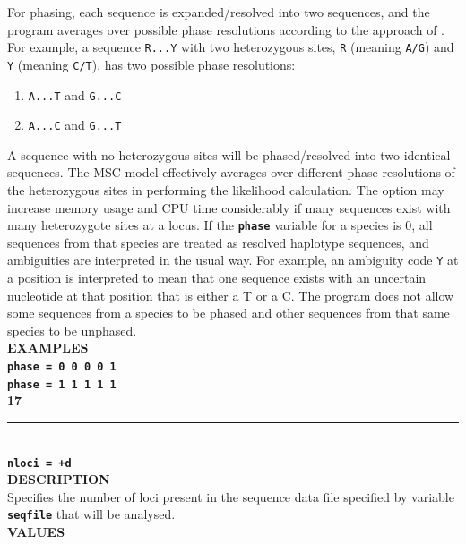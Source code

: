 \documentclass[a4paper]{book}
\numberwithin{equation}{section} \renewcommand{\baselinestretch}{0.55}
\begin{document}
For phasing, each sequence is expanded/resolved into two sequences,
and the program averages over possible phase resolutions according to
the approach of \citet{Gronau2011}.  For example, a sequence
\texttt{R...Y} with two heterozygous sites, \texttt{R} (meaning
\texttt{A/G}) and \texttt{Y} (meaning \texttt{C/T}), has two possible
phase resolutions:
\begin{enumerate}
\item \texttt{A...T} and \texttt{G...C}
\item \texttt{A...C} and \texttt{G...T}
\end{enumerate}
A sequence with no heterozygous sites will be phased/resolved into two
identical sequences.  The MSC model effectively averages over
different phase resolutions of the heterozygous sites in performing
the likelihood calculation.  The option may increase memory usage and
CPU time considerably if many sequences exist with many heterozygote
sites at a locus.  If the \textbf{\texttt{phase}} variable for a
species is 0, all sequences from that species are treated as resolved
haplotype sequences, and ambiguities are interpreted in the usual
way. For example, an ambiguity code \texttt{Y} at a position is
interpreted to mean that one sequence exists with an uncertain
nucleotide at that position that is either a T or a C.  The program
does not allow some sequences from a species to be phased and other
sequences from that same species to be unphased.  \vspace{5pt}\\
\textbf{EXAMPLES} \vspace{5pt}\\
\textbf{\texttt{phase = 0 0 0 0 1}} \vspace{5pt}\\
\textbf{\texttt{phase = 1 1 1 1 1}}\vspace{10pt}\\
\textbf{{\large 17}} \\
\noindent\rule{\textwidth}{0.8pt} \\
\textbf{{\Large \texttt{nloci = +d}}} \vspace{5pt}\\
\textbf{DESCRIPTION} \vspace{5pt}\\
Specifies the number of loci present in the sequence data file
specified by variable \textbf{\texttt{seqfile}}
that will be analysed. \vspace{5pt}\\
\textbf{VALUES} \vspace{5pt}\\
\end{document}
